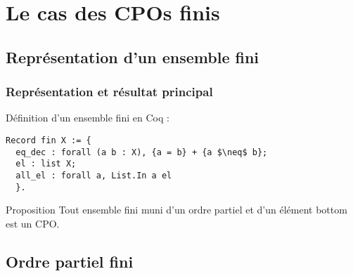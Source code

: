 \documentclass{beamer}
\begin{document}







\section{Le cas des CPOs finis}

\subsection{Représentation d'un ensemble fini}
\label{finis}

\begin{frame}[fragile]
\frametitle{Représentation et résultat principal}

Définition d'un ensemble fini en Coq :

\begin{lstlisting}[frame=single, language = Coq, basicstyle=\scriptsize]
Record fin X := {
  eq_dec : forall (a b : X), {a = b} + {a $\neq$ b};
  el : list X;
  all_el : forall a, List.In a el
  }.
\end{lstlisting}

\begin{alertblock}{Proposition}
Tout ensemble fini muni d'un ordre partiel et d'un élément bottom est un CPO.
\end{alertblock}



\end{frame}


\subsection{Ordre partiel fini}
\label{ordrepartiel}

\end{document}
